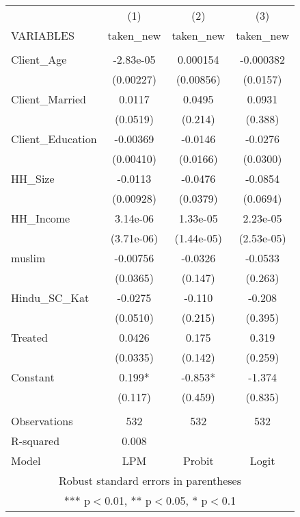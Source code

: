 \begin{tabular}{lccc} \hline
 & (1) & (2) & (3) \\
VARIABLES & taken\_new & taken\_new & taken\_new \\ \hline
 &  &  &  \\
Client\_Age & -2.83e-05 & 0.000154 & -0.000382 \\
 & (0.00227) & (0.00856) & (0.0157) \\
Client\_Married & 0.0117 & 0.0495 & 0.0931 \\
 & (0.0519) & (0.214) & (0.388) \\
Client\_Education & -0.00369 & -0.0146 & -0.0276 \\
 & (0.00410) & (0.0166) & (0.0300) \\
HH\_Size & -0.0113 & -0.0476 & -0.0854 \\
 & (0.00928) & (0.0379) & (0.0694) \\
HH\_Income & 3.14e-06 & 1.33e-05 & 2.23e-05 \\
 & (3.71e-06) & (1.44e-05) & (2.53e-05) \\
muslim & -0.00756 & -0.0326 & -0.0533 \\
 & (0.0365) & (0.147) & (0.263) \\
Hindu\_SC\_Kat & -0.0275 & -0.110 & -0.208 \\
 & (0.0510) & (0.215) & (0.395) \\
Treated & 0.0426 & 0.175 & 0.319 \\
 & (0.0335) & (0.142) & (0.259) \\
Constant & 0.199* & -0.853* & -1.374 \\
 & (0.117) & (0.459) & (0.835) \\
 &  &  &  \\
Observations & 532 & 532 & 532 \\
R-squared & 0.008 &  &  \\
 Model & LPM & Probit & Logit \\ \hline
\multicolumn{4}{c}{ Robust standard errors in parentheses} \\
\multicolumn{4}{c}{ *** p$<$0.01, ** p$<$0.05, * p$<$0.1} \\
\end{tabular}
